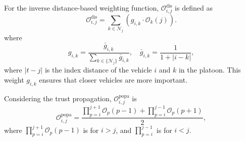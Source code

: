 \documentclass[letterpaper, 10pt, conference]{ieeeconf}  %
\def\N{\mathcal{N}} %
\def\O{\mathcal{O}} %
\begin{document}
For the inverse distance-based weighting function, $\O_{i,j}^{\text{dis}}$ is defined as
\begin{equation}
   \O_{i,j}^{\text{dis}} = \displaystyle \sum_{k \in \N_{j}  } \left( g_{i,k} \cdot \O_{k}(j) \right). 
\end{equation}
where 
\begin{equation}
    g_{i,k} = \dfrac{\bar{g}_{i,k}}{\sum_{k \in \{\N_{j} \}  } \bar{g}_{i,k}}, \quad \bar{g}_{i,k} = \dfrac{1}{1 + |i - k|},
\end{equation}
where $|t - j|$ is the index distance of the vehicle $i$ and $k$ in the platoon. 
This weight ${g}_{i,k}$ ensures that closer vehicles are more important. 

Considering the trust propagation, $\O_{i,j}^{\text{popa}}$ is
\begin{equation}
   \O_{i,j}^{\text{popa}} = \dfrac{\displaystyle \prod_{p=i}^{j+1} \O_p(p-1) + \displaystyle \prod_{p=i}^{j-1} \O_p(p+1)}{2},
\end{equation}
where $\displaystyle \prod_{p=i}^{j+1} \O_p(p-1)$ is for $i > j$, and $\displaystyle \prod_{p=i}^{j-1}$ is for $i < j$.
\end{document}
